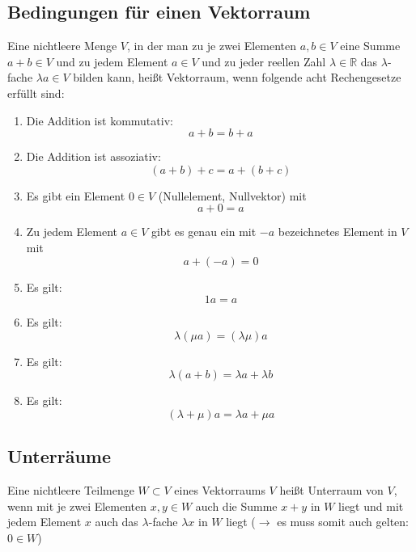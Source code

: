 \documentclass[a4paper,twocolumn,10pt]{article}
\begin{document}
\subsection{Bedingungen für einen Vektorraum}
Eine nichtleere Menge $V$, in der man zu je zwei Elementen $a,b\in V$ eine Summe $a+b\in V$ und zu jedem Element $a\in V$ und zu jeder reellen Zahl $\lambda \in\mathbb{R}$ das $\lambda$-fache $\lambda a\in V$ bilden kann, heißt Vektorraum, wenn folgende acht Rechengesetze erfüllt sind:
\begin{enumerate}
\item Die Addition ist kommutativ:
\begin{equation*}
a+b=b+a
\end{equation*}
\item Die Addition ist assoziativ:
\begin{equation*}
(a+b)+c=a+(b+c)
\end{equation*}
\item Es gibt ein Element $0\in V$ (Nullelement, Nullvektor) mit
\begin{equation*}
a+0=a
\end{equation*}
\item Zu jedem Element $a\in V$ gibt es genau ein mit $-a$ bezeichnetes Element in $V$ mit
\begin{equation*}
a+(-a)=0
\end{equation*}
\item Es gilt:
\begin{equation*}
1a=a
\end{equation*}
\item Es gilt:
\begin{equation*}
\lambda(\mu a)=(\lambda\mu)a
\end{equation*}
\item Es gilt:
\begin{equation*}
\lambda(a+b)=\lambda a+\lambda b
\end{equation*}
\item Es gilt:
\begin{equation*}
(\lambda+\mu)a=\lambda a+\mu a
\end{equation*}
\end{enumerate}

\subsection{Unterräume}
Eine nichtleere Teilmenge $W\subset V$ eines Vektorraums $V$ heißt Unterraum von $V$, wenn mit je zwei Elementen $x,y\in W$ auch die Summe $x+y$ in $W$ liegt und mit jedem Element $x$ auch das $\lambda$-fache $\lambda x$ in $W$ liegt ($\rightarrow$ es muss somit auch gelten: $0\in W$)
\end{document}
